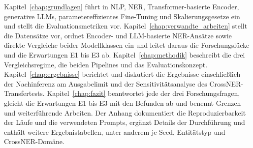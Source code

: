 Kapitel~\ref{chap:grundlagen} führt in NLP, NER, Transformer-basierte
Encoder, generative LLMs, parametereffizientes Fine-Tuning und
Skalierungsgesetze ein und stellt die Evaluationsmetriken vor.
Kapitel~\ref{chap:verwandte_arbeiten} stellt die Datensätze vor, ordnet
Encoder- und LLM-basierte NER-Ansätze sowie direkte Vergleiche beider
Modellklassen ein und leitet daraus die Forschungslücke und die
Erwartungen E1 bis E3 ab.
Kapitel~\ref{chap:methodik} beschreibt die drei Vergleichsregime, die
beiden Pipelines und das Evaluationskonzept.
Kapitel~\ref{chap:ergebnisse} berichtet und diskutiert die Ergebnisse
einschließlich der Nachinferenz am Ausgabelimit und der
Sensitivitätsanalyse des CrossNER-Transfertests.
Kapitel~\ref{chap:fazit} beantwortet jede der drei Forschungsfragen,
gleicht die Erwartungen E1 bis E3 mit den Befunden ab und benennt Grenzen
und weiterführende Arbeiten.
Der Anhang dokumentiert die Reproduzierbarkeit der Läufe und die
verwendeten Prompts, ergänzt Details der Durchführung und enthält
weitere Ergebnistabellen, unter anderem je Seed, Entitätstyp und
CrossNER-Domäne.
